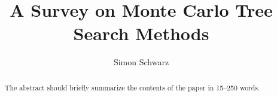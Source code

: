 

\title{A Survey on Monte Carlo Tree Search Methods}
\author{Simon Schwarz}
\maketitle
\begin{abstract}
The abstract should briefly summarize the contents of the paper in
15--250 words.
\end{abstract}








